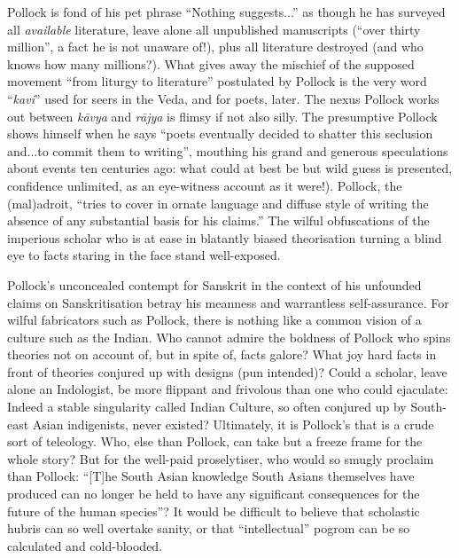 \vskip 3pt

Pollock is fond of his pet phrase “Nothing suggests...” as though he has surveyed all \textit{available} literature, leave alone all unpublished manuscripts (“over thirty million”, a fact he is not unaware of!), plus all literature destroyed (and who knows how many millions?). What gives away the mischief of the supposed movement “from liturgy to literature” postulated by Pollock is the very word “\textit{kavi}” used for seers in the Veda, and for poets, later. The nexus Pollock works out between \textit{kāvya} and \textit{rājya} is flimsy if not also silly. The presumptive Pollock shows himself when he says “poets eventually decided to shatter this seclusion and...to commit them to writing”, mouthing his grand and generous speculations about events ten centuries ago: what could at best be but wild guess is presented, confidence unlimited, as an eye-witness account as it were!). Pollock, the (mal)adroit, “tries to cover in ornate language and diffuse style of writing the absence of any substantial basis for his claims.” The wilful obfuscations of the imperious scholar who is at ease in blatantly biased theorisation turning a blind eye to facts staring in the face stand well-exposed.

Pollock’s unconcealed contempt for Sanskrit in the context of his unfounded claims on Sanskritisation betray his meanness and warrantless self-assurance. For wilful fabricators such as Pollock, there is nothing like a common vision of a culture such as the Indian. Who cannot admire the boldness of Pollock who spins theories not on account of, but in spite of, facts galore? What joy hard facts in front of theories conjured up with designs (pun intended)? Could a scholar, leave alone an Indologist, be more flippant and frivolous than one who could ejaculate: Indeed a stable singularity called Indian Culture, so often conjured up by South-east Asian indigenists, never existed? Ultimately, it is Pollock’s that is a crude sort of teleology. Who, else than Pollock, can take but a freeze frame for the whole story? But for the well-paid proselytiser, who would so smugly proclaim than Pollock: “[T]he South Asian knowledge South Asians themselves have produced can no longer be held to have any significant consequences for the future of the human species”? It would be difficult to believe that scholastic hubris can so well overtake sanity, or that “intellectual” pogrom can be so calculated and cold-blooded.

